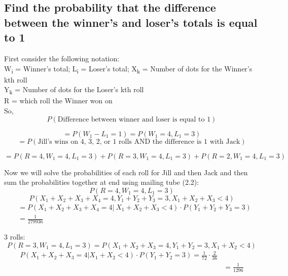 \documentclass{article}
\numberwithin{equation}{section}
\newcommand{\Z}{&=}
\newcommand{\eqname}[1]{\tag*{#1}}%
\begin{document}
\pagebreak
\subsection{Find the probability that the difference between the winner's and loser's totals is equal to 1}
First consider the following notation: \\
\indent W\textsubscript{i} = Winner's total; 
\indent L\textsubscript{i} = Loser's total; 
\indent X\textsubscript{k} = Number of dots for the Winner's kth roll \\
\indent Y\textsubscript{k} = Number of dots for the Loser's kth roll \\
\indent R = which roll the Winner won on   \\
So,\\

\begin{equation}
    P(\text{Difference between winner and loser is equal to 1}) 
\end{equation}

\begin{equation}
    = P(W_1-L_1 = 1) = P(W_1 = 4, L_1 = 3)  
\end{equation}
\begin{equation}
    = P(\text{Jill's wins on 4, 3, 2, or 1 rolls AND the difference is 1 with Jack})
\end{equation}

\begin{equation}
    = P(R = 4, W_1 = 4, L_1 = 3) + P(R = 3, W_1 = 4, L_1 = 3) + P(R = 2, W_1 = 4, L_1 = 3)  \eqname{(Using (2.2)}
\end{equation}

Now we will solve the probabilities of each roll for Jill and then Jack and then sum the probabilities together at end using mailing tube (2.2):
\begin{equation}
    P(R = 4, W_1 = 4, L_1 = 3)
\end{equation}
\begin{equation}
    P(X_1+X_2+X_3+X_4 = 4, Y_1+Y_2+Y_3 = 3, X_1+X_2+X_3 < 4)
\end{equation}
\begin{align}
        \Z P(X_1+X_2+X_3+X_4 = 4 \vert \:  X_1+X_2+X_3 < 4)\cdot P(Y_1+Y_2+Y_3 = 3) \eqname{Using (2.7)} \\
        \Z \frac{1}{279936} 
\end{align}

3 rolls: \\
\begin{equation}
    P(R = 3, W_1 = 4, L_1 = 3) = P(X_1+X_2+X_3 = 4, Y_1+Y_2 = 3, X_1+X_2 < 4) 
\end{equation}
\begin{align}
    P(X_1+X_2+X_3 = 4 \vert  X_1+X_2 < 4) \cdot P( Y_1+Y_2 = 3) = \frac{1}{72} \cdot \frac{2}{36}\eqname{Using (2.7)} \\
    \Z \frac{1}{1296}
\end{align}
\end{document}
